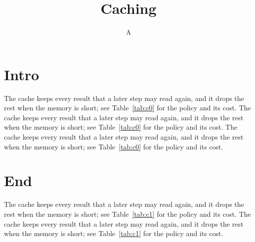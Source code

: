\documentclass[twocolumn]{article}
\begin{document}
\title{Caching}\author{A}\maketitle
\section{Intro}
The cache keeps every result that a later step may read again, and it drops the rest when the memory is short; see Table~\ref{tab:c0} for the policy and its cost. The cache keeps every result that a later step may read again, and it drops the rest when the memory is short; see Table~\ref{tab:c0} for the policy and its cost. The cache keeps every result that a later step may read again, and it drops the rest when the memory is short; see Table~\ref{tab:c0} for the policy and its cost. 



\section{End}
The cache keeps every result that a later step may read again, and it drops the rest when the memory is short; see Table~\ref{tab:c1} for the policy and its cost. The cache keeps every result that a later step may read again, and it drops the rest when the memory is short; see Table~\ref{tab:c1} for the policy and its cost. 
\end{document}
